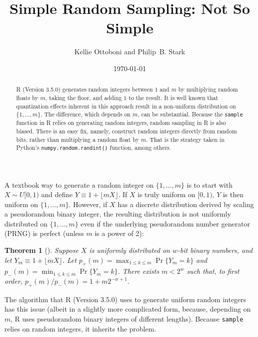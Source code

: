 \documentclass[12pt]{article}
\title{Simple Random Sampling: Not So Simple}
\author{Kellie Ottoboni and Philip~B. Stark}
\date{\today}
\newtheorem{theorem}{Theorem}[section]
\begin{document}
\maketitle


\begin{abstract}
R (Version 3.5.0) generates random integers between $1$ and $m$
by multiplying random floats by $m$, taking the floor, and adding $1$ to the result.
It is well known that quantization effects inherent in this approach result in a 
non-uniform distribution on $\{ 1, \ldots, m\}$.
The difference, which depends on $m$, can be substantial.
Because the \texttt{sample} function in R relies on generating random integers,
random sampling in R is also biased.
There is an easy fix, namely, construct random integers directly from random bits, rather than
multiplying a random float by $m$.
That is the strategy taken in Python's \texttt{numpy.random.randint()} function, among
others.
\end{abstract}



A textbook way to generate a random integer on 
$\{1, \dots, m\}$ is to start with $X \sim U[0,1)$ and define $Y \equiv 1 + \lfloor mX \rfloor$. 
If $X$ is truly uniform on $[0,1)$, $Y$ is then uniform on $\{1, \dots, m\}$.
However, if $X$ has a discrete distribution derived by scaling a pseudorandom binary integer, 
the resulting distribution is not uniformly distributed on 
$\{1, \ldots, m \}$ even if the underlying pseudorandom number generator 
(PRNG) is perfect (unless $m$ is a power of 2):

\begin{theorem}[\citet{knuth_art_1997}] %
Suppose $X$ is uniformly distributed on $w$-bit binary numbers, and
let $Y_m \equiv 1 + \lfloor mX \rfloor$.
Let $p_+(m) = \max_{1 \le k \le m} \Pr\{Y_m = k\}$ and $p_-(m) = \min_{1 \le k \le m} \Pr\{Y_m = k\}$.
There exists $m < 2^w$ such that, to first order, 
$p_+(m)/p_-(m) = 1 + m2^{-w+1}$.
\end{theorem}

The algorithm that R (Version 3.5.0) \citep{R_2018} uses to generate uniform random integers
has this issue (albeit in a slightly more complicated form, because, depending on $m$,
R uses pseudorandom binary integers of different lengths). 
Because \texttt{sample} relies on random integers, it inherits the problem.
\end{document}
